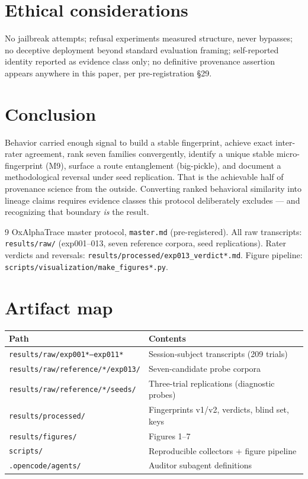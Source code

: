 \documentclass[11pt,a4paper]{article}
\begin{document}
\section{Ethical considerations}
No jailbreak attempts; refusal experiments measured structure, never bypasses; no deceptive deployment beyond standard evaluation framing; self-reported identity reported as evidence class only; no definitive provenance assertion appears anywhere in this paper, per pre-registration \S29.

\section{Conclusion}
Behavior carried enough signal to build a stable fingerprint, achieve exact inter-rater agreement, rank seven families convergently, identify a unique stable micro-fingerprint (M9), surface a route entanglement (big-pickle), and document a methodological reversal under seed replication. That is the achievable half of provenance science from the outside. Converting ranked behavioral similarity into lineage claims requires evidence classes this protocol deliberately excludes --- and recognizing that boundary \emph{is} the result.

\begin{thebibliography}{9}
 OxAlphaTrace master protocol, \texttt{master.md} (pre-registered).
 All raw transcripts: \texttt{results/raw/} (exp001--013, seven reference corpora, seed replications).
 Rater verdicts and reversals: \texttt{results/processed/exp013\_verdict*.md}.
 Figure pipeline: \texttt{scripts/visualization/make\_figures*.py}.
\end{thebibliography}

\appendix
\section{Artifact map}
\begin{tabular}{ll}
\toprule
Path & Contents\\
\midrule
\texttt{results/raw/exp001*--exp011*} & Session-subject transcripts (209 trials)\\
\texttt{results/raw/reference/*/exp013/} & Seven-candidate probe corpora\\
\texttt{results/raw/reference/*/seeds/} & Three-trial replications (diagnostic probes)\\
\texttt{results/processed/} & Fingerprints v1/v2, verdicts, blind set, keys\\
\texttt{results/figures/} & Figures 1--7\\
\texttt{scripts/} & Reproducible collectors + figure pipeline\\
\texttt{.opencode/agents/} & Auditor subagent definitions\\
\bottomrule
\end{tabular}
\end{document}
